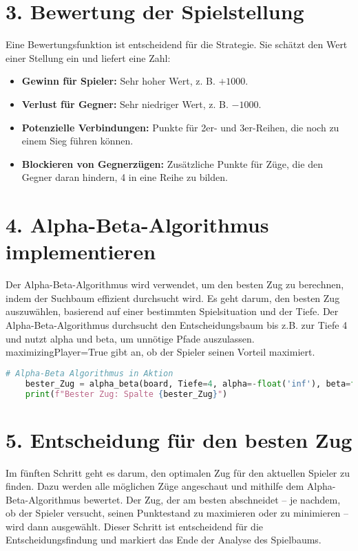 \section*{3. Bewertung der Spielstellung}

Eine Bewertungsfunktion ist entscheidend für die Strategie. Sie schätzt den Wert einer Stellung ein und liefert eine Zahl:

\begin{itemize}
	\item \textbf{Gewinn für Spieler:} Sehr hoher Wert, z. B. \( +1000 \).
	\item \textbf{Verlust für Gegner:} Sehr niedriger Wert, z. B. \( -1000 \).
	\item \textbf{Potenzielle Verbindungen:} Punkte für 2er- und 3er-Reihen, die noch zu einem Sieg führen können.
	\item \textbf{Blockieren von Gegnerzügen:} Zusätzliche Punkte für Züge, die den Gegner daran hindern, 4 in eine Reihe zu bilden.
\end{itemize}

\section*{4. Alpha-Beta-Algorithmus implementieren}
	Der Alpha-Beta-Algorithmus wird verwendet, um den besten Zug zu berechnen, indem der Suchbaum effizient durchsucht wird. 
    Es geht darum, den besten Zug auszuwählen, basierend auf einer bestimmten Spielsituation und der Tiefe. Der Alpha-Beta-Algorithmus durchsucht den Entscheidungsbaum bis z.B. zur Tiefe 4 und nutzt alpha und beta, um unnötige Pfade auszulassen. maximizingPlayer=True gibt an, ob der Spieler seinen Vorteil maximiert.
\begin{lstlisting}[language=Python, caption=Alpha-Beta Algorithmus - Kurzer Überblick]
	# Alpha-Beta Algorithmus in Aktion
	bester_Zug = alpha_beta(board, Tiefe=4, alpha=-float('inf'), beta=float('inf'), maximizingPlayer=True)
	print(f"Bester Zug: Spalte {bester_Zug}")
\end{lstlisting}

\section*{5. Entscheidung für den besten Zug}

Im fünften Schritt geht es darum, den optimalen Zug für den aktuellen Spieler zu finden. Dazu werden alle möglichen Züge angeschaut und mithilfe dem Alpha-Beta-Algorithmus bewertet. Der Zug, der am besten abschneidet – je nachdem, ob der Spieler versucht, seinen Punktestand zu maximieren oder zu minimieren – wird dann ausgewählt. Dieser Schritt ist entscheidend für die Entscheidungsfindung und markiert das Ende der Analyse des Spielbaums.

